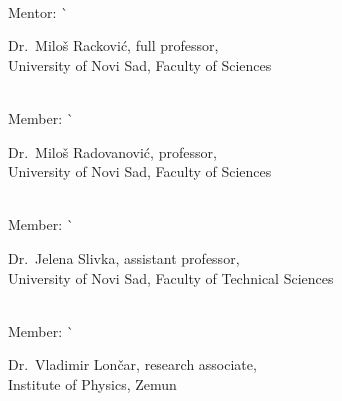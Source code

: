 \begin{tabbing}
\begin{minipage}[t]{.7\textwidth}
    \vspace*{1mm}
    \end{minipage}                                          \\
  Mentor:                  \`
    \begin{minipage}[t]{.7\textwidth}
    Dr.~Miloš Racković, full professor,\\
    University of Novi Sad, Faculty of Sciences
    \vspace*{1mm}
    \end{minipage}                                          \\
  Member:                  \`
    \begin{minipage}[t]{.7\textwidth}
    Dr.~Miloš Radovanović, professor,\\
    University of Novi Sad, Faculty of Sciences
    \vspace*{1mm}
    \end{minipage}                                          \\
  Member:                  \`
    \begin{minipage}[t]{.7\textwidth}
    Dr.~Jelena Slivka, assistant professor,\\
    University of Novi Sad, Faculty of Technical Sciences
    \vspace*{1mm}
    \end{minipage}                                          \\
  Member:                  \`
    \begin{minipage}[t]{.7\textwidth}
    Dr.~Vladimir Lončar, research associate,\\
    Institute of Physics, Zemun
    \vspace*{1mm}
    \end{minipage}                                          \\
\end{tabbing}
